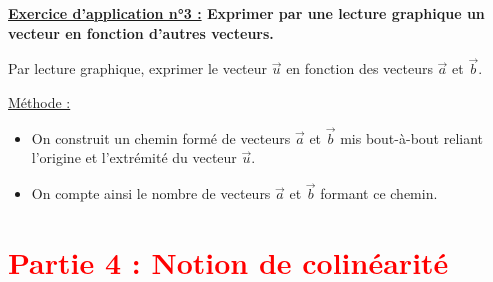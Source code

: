 \documentclass[12pt]{article}
\begin{document}
\begin{mdframed}[
    linewidth=1pt,
    roundcorner=5pt,
    linecolor=RoyalBlue,
    innertopmargin=10pt,
    innerbottommargin=10pt
]
{\color{RoyalBlue}\textbf{\underline{Exercice d'application n°3 :} Exprimer par une lecture 
graphique un vecteur en fonction d'autres vecteurs.}}
\vspace{10pt}

\begin{minipage}{.35\textwidth}%
\end{minipage}%
\hfill
\begin{minipage}{.65\textwidth}%
    Par lecture graphique, exprimer le vecteur $\overrightarrow{u}$ en fonction des
    vecteurs $\overrightarrow{a}$ et $\overrightarrow{b}$.
\end{minipage}%

\vspace{10pt}
\underline{Méthode :}
\vspace{5pt}
\begin{itemize}
    \item On construit un chemin formé de vecteurs $\overrightarrow{a}$ et $\overrightarrow{b}$ 
    mis bout-à-bout reliant l’origine 
    et l’extrémité du vecteur $\overrightarrow{u}$.
    \item On compte ainsi le nombre de vecteurs $\overrightarrow{a}$ et $\overrightarrow{b}$ 
    formant ce chemin.
\end{itemize}

\end{mdframed}

\newpage


\section*{\textcolor{red}{Partie 4 : Notion de colinéarité}}
\end{document}
